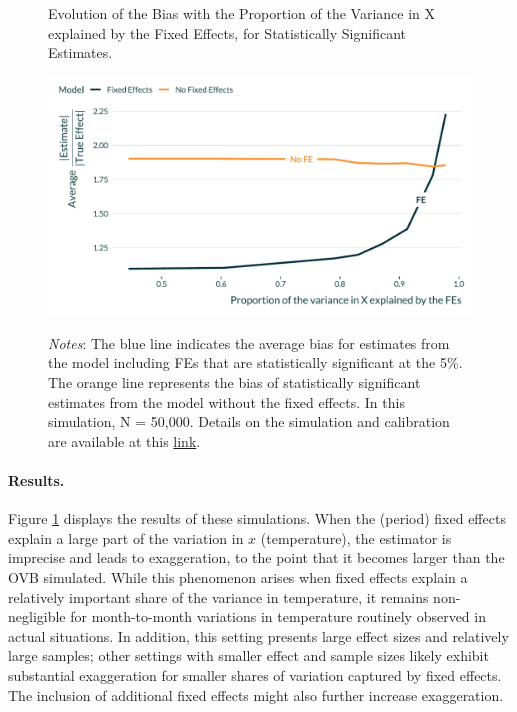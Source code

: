 \documentclass[usletter, 12pt]{article}
\begin{document}
        
       			 \begin{figure}[!h] 
				\begin{center}
					\caption{Evolution of the Bias with the Proportion of the Variance in X explained by the Fixed Effects, for Statistically Significant Estimates.}
					\label{graph_fe}
					\includegraphics[width=0.8\linewidth]{images/main_graph_fe_paper_annotated.pdf}
		      			\caption*{\footnotesize \textit{Notes}: The blue line indicates the average bias for estimates from the model including FEs that are statistically significant at the 5\%. The orange line represents the bias of statistically significant estimates from the model without the fixed effects. In this simulation, N = 50,000. Details on the simulation and calibration are available at this \href{https://vincentbagilet.github.io/causal_exaggeration/FE.html}{link}.}
				\end{center}
				\vspace{-1cm}
			\end{figure} 
			
			\paragraph{Results.}  Figure \ref{graph_fe} displays the results of these simulations. When the (period) fixed effects explain a large part of the variation in $x$ (temperature), the estimator is imprecise and leads to exaggeration, to the point that it becomes larger than the OVB simulated.
			While this phenomenon arises when fixed effects explain a relatively important share of the variance in temperature, it remains non-negligible for month-to-month variations in temperature routinely observed in actual situations. In addition, this setting presents large effect sizes and relatively large samples; other settings with smaller effect and sample sizes likely exhibit substantial exaggeration for smaller shares of variation captured by fixed effects. The inclusion of additional fixed effects might also further increase exaggeration.
\end{document}
